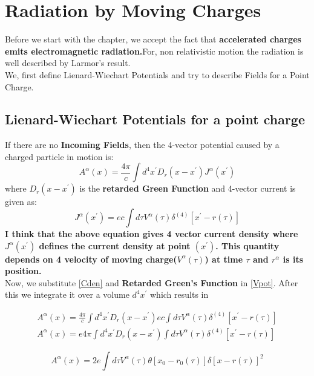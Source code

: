 \documentclass[11pt]{report}
\newcommand{\rr}[1]{\left[{#1}\right]}
\begin{document}
\section{Radiation by Moving Charges}
Before we start with the chapter, we accept the fact that \textbf{accelerated charges emits electromagnetic radiation.}For, non relativistic motion the radiation is well described by Larmor's result.\\
We, first define Lienard-Wiechart Potentials and try to describe Fields for a Point Charge.
\subsection{Lienard-Wiechart Potentials for a point charge}
If there are no \textbf{Incoming Fields}, then the 4-vector potential caused by a charged particle in motion is:
\begin{equation}\label{Vpot}
A^\alpha(x)=\frac{4 \pi}{c}\int d^4x^\prime D_r(x-x^\prime)J^\alpha(x^\prime)
\end{equation}
where $D_r(x-x^\prime)$ is the \textbf{retarded Green Function} and 4-vector current is given as:
\begin{equation}\label{Cden}
J^\alpha(x^\prime)=ec\int d\tau V^\alpha(\tau)\delta^{(4)}\rr{x^\prime-r(\tau)}
\end{equation}
\textbf{I think that the above equation gives 4 vector current density where $J^{\alpha}(x^\prime)$ defines the current density at point $(x^\prime)$. This quantity depends on 4 velocity of moving charge($V^\alpha(\tau)$) at time $\tau$ and $r^\alpha$ is its position.}\\

Now, we substitute \eqref{Cden} and \textbf{Retarded Green's Function} in \eqref{Vpot}. After this we integrate it over a volume $d^4 x^\prime$ which results in

\begin{eqnarray*}
A^\alpha(x)=\frac{4 \pi}{c}\int d^4x^\prime D_r(x-x^\prime)ec\int d\tau V^\alpha(\tau)\delta^{(4)}\rr{x^\prime-r(\tau)}\\
A^\alpha(x)=e4 \pi\int d^4x^\prime D_r(x-x^\prime)\int d\tau V^\alpha(\tau)\delta^{(4)}\rr{x^\prime-r(\tau)}
\end{eqnarray*}



\begin{equation}\label{Vpotf}
A^\alpha(x)=2e\int d\tau V^\alpha(\tau)\theta\rr{x_0-r_0(\tau)}\delta\rr{x-r(\tau)}^2
\end{equation}
\end{document}
